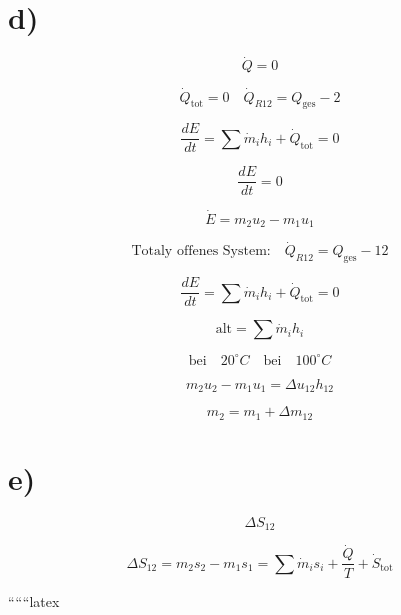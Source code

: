 \section*{d)}

\[
\dot{Q} = 0
\]

\[
\dot{Q}_{\text{tot}} = 0 \quad \dot{Q}_{R12} = Q_{\text{ges}} - 2
\]

\[
\frac{dE}{dt} = \sum \dot{m}_i h_i + \dot{Q}_{\text{tot}} = 0
\]

\[
\frac{dE}{dt} = 0
\]

\[
\dot{E} = m_2 u_2 - m_1 u_1
\]

\[
\text{Totaly offenes System:} \quad \dot{Q}_{R12} = Q_{\text{ges}} - 12
\]

\[
\frac{dE}{dt} = \sum \dot{m}_i h_i + \dot{Q}_{\text{tot}} = 0
\]

\[
\text{alt} = \sum \dot{m}_i h_i
\]

\[
\text{bei} \quad 20^\circ C \quad \text{bei} \quad 100^\circ C
\]

\[
m_2 u_2 - m_1 u_1 = \Delta u_{12} h_{12}
\]

\[
m_2 = m_1 + \Delta m_{12}
\]

\section*{e)}

\[
\Delta S_{12}
\]

\[
\Delta S_{12} = m_2 s_2 - m_1 s_1 = \sum \dot{m}_i s_i + \frac{\dot{Q}}{T} + \dot{S}_{\text{tot}}
\]

``````latex


